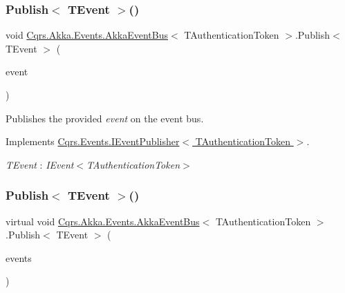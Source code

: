 \subsubsection{\texorpdfstring{Publish$<$ T\+Event $>$()}{Publish< TEvent >()}\hspace{0.1cm}{\footnotesize\ttfamily [1/2]}}
{\footnotesize\ttfamily void \hyperlink{classCqrs_1_1Akka_1_1Events_1_1AkkaEventBus}{Cqrs.\+Akka.\+Events.\+Akka\+Event\+Bus}$<$ T\+Authentication\+Token $>$.Publish$<$ T\+Event $>$ (\begin{DoxyParamCaption}\item[{T\+Event @}]{event }\end{DoxyParamCaption})}



Publishes the provided {\itshape event}  on the event bus. 



Implements \hyperlink{interfaceCqrs_1_1Events_1_1IEventPublisher_a02f0db0bc9b3aa1c7f766f58f8422ee3_a02f0db0bc9b3aa1c7f766f58f8422ee3}{Cqrs.\+Events.\+I\+Event\+Publisher$<$ T\+Authentication\+Token $>$}.

\begin{Desc}
\item[Type Constraints]\begin{description}
\item[{\em T\+Event} : {\em I\+Event$<$T\+Authentication\+Token$>$}]\end{description}
\end{Desc}
\mbox{\label{classCqrs_1_1Akka_1_1Events_1_1AkkaEventBus_ad5b996dd77efbf51a2b5a32f94417772_ad5b996dd77efbf51a2b5a32f94417772}} 
\subsubsection{\texorpdfstring{Publish$<$ T\+Event $>$()}{Publish< TEvent >()}\hspace{0.1cm}{\footnotesize\ttfamily [2/2]}}
{\footnotesize\ttfamily virtual void \hyperlink{classCqrs_1_1Akka_1_1Events_1_1AkkaEventBus}{Cqrs.\+Akka.\+Events.\+Akka\+Event\+Bus}$<$ T\+Authentication\+Token $>$.Publish$<$ T\+Event $>$ (\begin{DoxyParamCaption}\item[{I\+Enumerable$<$ T\+Event $>$}]{events }\end{DoxyParamCaption})\hspace{0.3cm}{\ttfamily [virtual]}}




